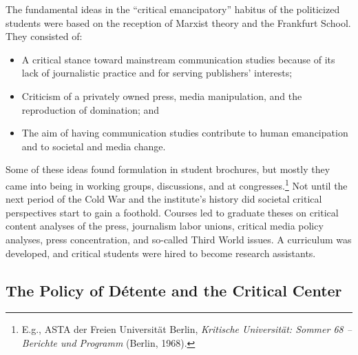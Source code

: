 \documentclass{tufte-handout}
\begin{document}
The fundamental ideas in the ``critical emancipatory'' habitus of the
politicized students were based on the reception of Marxist theory and
the Frankfurt School. They consisted of:
\begin{itemize}
\item
  A critical stance toward mainstream communication studies because of
  its lack of journalistic practice and for serving publishers'
  interests;
\item
  Criticism of a privately owned press, media manipulation, and the
  reproduction of domination; and
\item
  The aim of having communication studies contribute to human
  emancipation and to societal and media change.
\end{itemize}

\noindent Some of these ideas found formulation in student brochures, but mostly
they came into being in working groups, discussions, and at
congresses.\footnote{E.g., ASTA der Freien Universität Berlin,
  \emph{Kritische Universität: Sommer 68 -- Berichte und Programm}
  (Berlin, 1968).} Not until the next period of the Cold War and the
institute's history did societal critical perspectives start to gain a
foothold. Courses led to graduate theses on critical content analyses of
the press, journalism labor unions, critical media policy analyses,
press concentration, and so-called Third World issues. A curriculum was
developed, and critical students were hired to become research
assistants.

\hypertarget{the-policy-of-dtente-and-the-critical-center}{%
\subsection{The Policy of Détente and the
Critical
Center}\label{the-policy-of-dtente-and-the-critical-center}}
\end{document}

